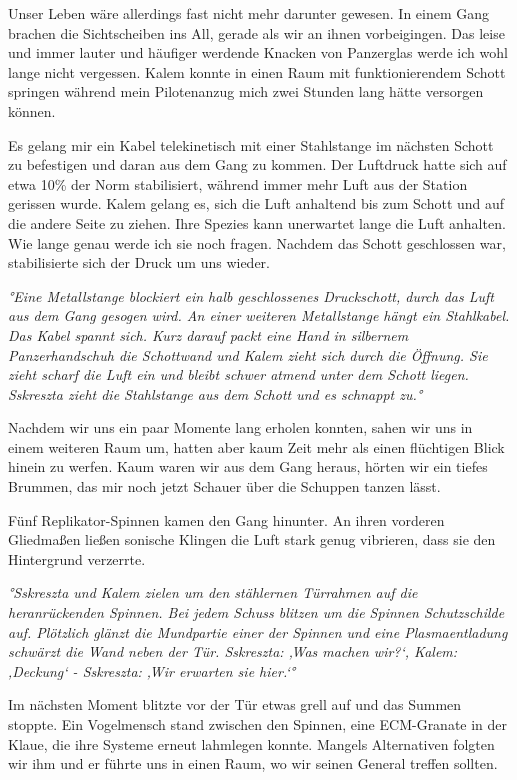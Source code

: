 \documentclass[11pt]{scrartcl}
\begin{document}
Unser Leben wäre allerdings fast nicht mehr darunter gewesen. In einem
Gang brachen die Sichtscheiben ins All, gerade als wir an ihnen
vorbeigingen. Das leise und immer lauter und häufiger werdende Knacken
von Panzerglas werde ich wohl lange nicht vergessen. Kalem konnte in
einen Raum mit funktionierendem Schott springen während mein
Pilotenanzug mich zwei Stunden lang hätte versorgen können.

Es gelang mir ein Kabel telekinetisch mit einer Stahlstange im nächsten
Schott zu befestigen und daran aus dem Gang zu kommen. Der Luftdruck
hatte sich auf etwa 10\% der Norm stabilisiert, während immer mehr Luft
aus der Station gerissen wurde. Kalem gelang es, sich die Luft anhaltend
bis zum Schott und auf die andere Seite zu ziehen. Ihre Spezies kann
unerwartet lange die Luft anhalten. Wie lange genau werde ich sie noch
fragen. Nachdem das Schott geschlossen war, stabilisierte sich der Druck
um uns wieder.

\emph{°Eine Metallstange blockiert ein halb geschlossenes Druckschott,
durch das Luft aus dem Gang gesogen wird. An einer weiteren Metallstange
hängt ein Stahlkabel. Das Kabel spannt sich. Kurz darauf packt eine Hand
in silbernem Panzerhandschuh die Schottwand und Kalem zieht sich durch
die Öffnung. Sie zieht scharf die Luft ein und bleibt schwer atmend
unter dem Schott liegen. Sskreszta zieht die Stahlstange aus dem Schott
und es schnappt zu.°}

Nachdem wir uns ein paar Momente lang erholen konnten, sahen wir uns in
einem weiteren Raum um, hatten aber kaum Zeit mehr als einen flüchtigen
Blick hinein zu werfen. Kaum waren wir aus dem Gang heraus, hörten wir
ein tiefes Brummen, das mir noch jetzt Schauer über die Schuppen tanzen
lässt.

Fünf Replikator-Spinnen kamen den Gang hinunter. An ihren vorderen
Gliedmaßen ließen sonische Klingen die Luft stark genug vibrieren, dass
sie den Hintergrund verzerrte.

\emph{°Sskreszta und Kalem zielen um den stählernen Türrahmen auf die
heranrückenden Spinnen. Bei jedem Schuss blitzen um die Spinnen
Schutzschilde auf. Plötzlich glänzt die Mundpartie einer der Spinnen und
eine Plasmaentladung schwärzt die Wand neben der Tür. Sskreszta: ‚Was
machen wir?`, Kalem: ‚Deckung` - Sskreszta: ‚Wir erwarten sie hier.`°}

Im nächsten Moment blitzte vor der Tür etwas grell auf und das Summen
stoppte. Ein Vogelmensch stand zwischen den Spinnen, eine ECM-Granate in
der Klaue, die ihre Systeme erneut lahmlegen konnte. Mangels
Alternativen folgten wir ihm und er führte uns in einen Raum, wo wir
seinen General treffen sollten.
\end{document}
